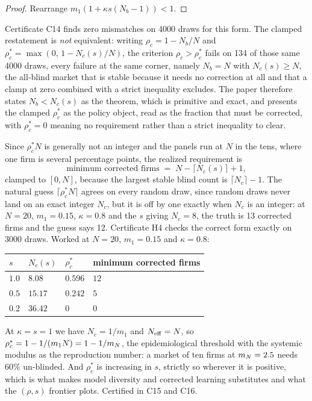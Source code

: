 \begin{proof}
Rearrange $m_1(1+\kappa s(N_b-1)) < 1$.
\end{proof}

Certificate C14 finds zero mismatches on 4000 draws for this form. The clamped restatement is \emph{not} equivalent: writing $\rho_c = 1-N_b/N$ and $\rho_c^\ast = \max(0,\,1-N_c(s)/N)$, the criterion $\rho_c > \rho_c^\ast$ fails on 134 of those same 4000 draws, every failure at the same corner, namely $N_b = N$ with $N_c(s) \geq N$, the all-blind market that is stable because it needs no correction at all and that a clamp at zero combined with a strict inequality excludes. The paper therefore states $N_b < N_c(s)$ as the theorem, which is primitive and exact, and presents the clamped $\rho_c^\ast$ as the policy object, read as the fraction that must be corrected, with $\rho_c^\ast = 0$ meaning no requirement rather than a strict inequality to clear.

Since $\rho_c^\ast N$ is generally not an integer and the panels run at $N$ in the tens, where one firm is several percentage points, the realized requirement is
\[
  \text{minimum corrected firms} \;=\; N - \lceil N_c(s)\rceil + 1,
\]
clamped to $[0,N]$, because the largest stable blind count is $\lceil N_c\rceil - 1$. The natural guess $\lceil \rho_c^\ast N\rceil$ agrees on every random draw, since random draws never land on an exact integer $N_c$, but it is off by one exactly when $N_c$ is an integer: at $N=20$, $m_1=0.15$, $\kappa=0.8$ and the $s$ giving $N_c=8$, the truth is 13 corrected firms and the guess says 12. Certificate H4 checks the correct form exactly on 3000 draws. Worked at $N=20$, $m_1=0.15$ and $\kappa=0.8$:

\begin{center}
\small
\begin{tabular}{llll}
\toprule
$s$ & $N_c(s)$ & $\rho_c^\ast$ & minimum corrected firms \\
\midrule
$1.0$ & $8.08$ & $0.596$ & $12$ \\
$0.5$ & $15.17$ & $0.242$ & $5$ \\
$0.2$ & $36.42$ & $0$ & $0$ \\
\bottomrule
\end{tabular}
\end{center}

At $\kappa = s = 1$ we have $N_c = 1/m_1$ and $N_{\mathrm{eff}} = N$, so $\rho_c^\ast = 1 - 1/(m_1N) = 1 - 1/m_N$, the epidemiological threshold with the systemic modulus as the reproduction number: a market of ten firms at $m_N = 2.5$ needs $60\%$ un-blinded. And $\rho_c^\ast$ is increasing in $s$, strictly so wherever it is positive, which is what makes model diversity and corrected learning substitutes and what the $(\rho,s)$ frontier plots. Certified in C15 and C16.


